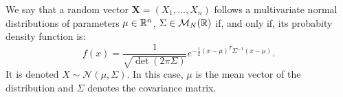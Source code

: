 \begin{ndef}
We say that a random vector $\bm{X} = (X_1,\dots,X_n)$ follows a multivariate normal distributions of parameters
$\mu \in \mathbb{R}^n$, $\Sigma \in \mathcal M_N(\mathbb{R})$ if, and only if, its probabity density function is:
\begin{equation*}\label{gaussian:function}
f(x) = \frac{1}{\sqrt{\det(2\pi \Sigma)}}e^{-\frac{1}{2}(x - \mu )^T \Sigma^{-1} (x-\mu)}.
\end{equation*}
It is denoted $X \sim \mathcal N(\mu, \Sigma)$.
In this case, $\mu$ is the mean vector of the distribution and $\Sigma$ denotes the covariance matrix.  
\end{ndef}
